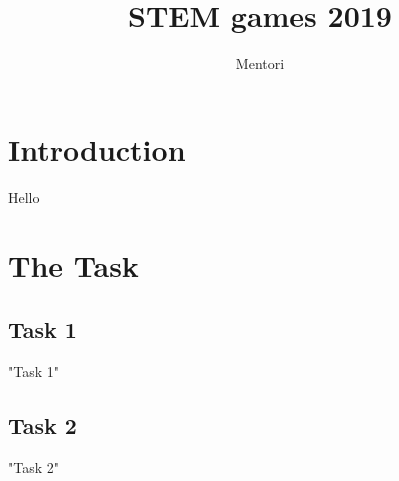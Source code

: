 \documentclass{article}
\title{STEM games 2019}
\author{Mentori}
\begin{document}
	
	\maketitle
	
	
	
	\section{Introduction}
	Hello
	
	
	\section{The Task}
	
	\subsection{Task 1}
	
	{"Task 1"}
	
	\subsection{Task 2}
	
	{"Task 2"}
	
	
	
\end{document}
